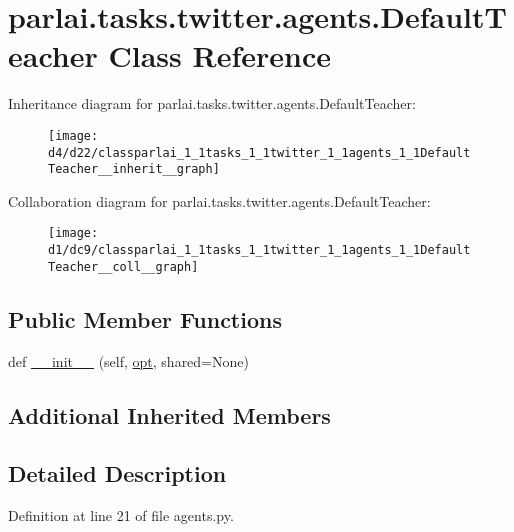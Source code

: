 \hypertarget{classparlai_1_1tasks_1_1twitter_1_1agents_1_1DefaultTeacher}{}\section{parlai.\+tasks.\+twitter.\+agents.\+Default\+Teacher Class Reference}
\label{classparlai_1_1tasks_1_1twitter_1_1agents_1_1DefaultTeacher}


Inheritance diagram for parlai.\+tasks.\+twitter.\+agents.\+Default\+Teacher\+:
\nopagebreak
\begin{figure}[H]
\begin{center}
\leavevmode
\texttt{[image: d4/d22/classparlai\_1\_1tasks\_1\_1twitter\_1\_1agents\_1\_1DefaultTeacher\_\_inherit\_\_graph]}
\end{center}
\end{figure}


Collaboration diagram for parlai.\+tasks.\+twitter.\+agents.\+Default\+Teacher\+:
\nopagebreak
\begin{figure}[H]
\begin{center}
\leavevmode
\texttt{[image: d1/dc9/classparlai\_1\_1tasks\_1\_1twitter\_1\_1agents\_1\_1DefaultTeacher\_\_coll\_\_graph]}
\end{center}
\end{figure}
\subsection*{Public Member Functions}
\begin{DoxyCompactItemize}
\item 
def \hyperlink{classparlai_1_1tasks_1_1twitter_1_1agents_1_1DefaultTeacher_a6351654c7d50fa7c723a2d38bd00d0d8}{\+\_\+\+\_\+init\+\_\+\+\_\+} (self, \hyperlink{classparlai_1_1core_1_1agents_1_1Teacher_a3ce6243860ce978a897922863ed32fa4}{opt}, shared=None)
\end{DoxyCompactItemize}
\subsection*{Additional Inherited Members}


\subsection{Detailed Description}


Definition at line 21 of file agents.\+py.



